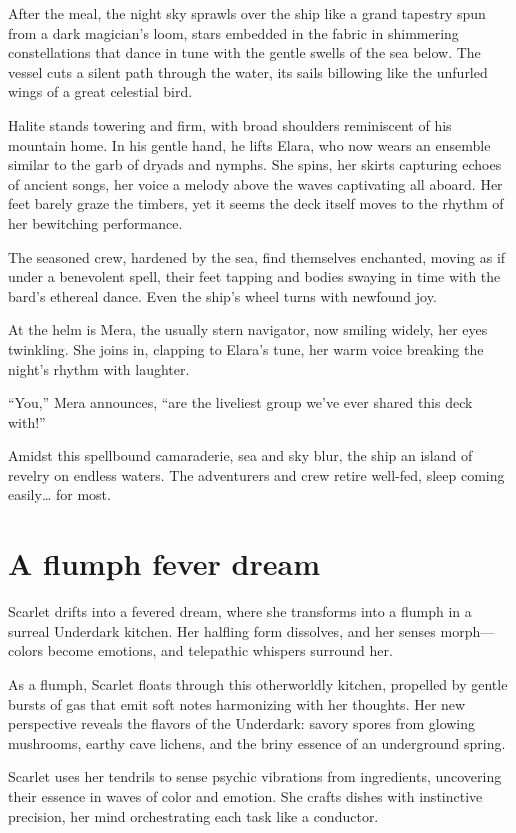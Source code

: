 \documentclass[
  letterpaper,12pt,twoside,twocolumn,openany,
  nodeprecatedcode,bg=full]{dndbook}
\begin{document}
After the meal, the night sky sprawls over the ship like a grand
tapestry spun from a dark magician's loom, stars embedded in the fabric
in shimmering constellations that dance in tune with the gentle swells
of the sea below. The vessel cuts a silent path through the water, its
sails billowing like the unfurled wings of a great celestial bird.

Halite stands towering and firm, with broad shoulders reminiscent of his
mountain home. In his gentle hand, he lifts Elara, who now wears an
ensemble similar to the garb of dryads and nymphs. She spins, her skirts
capturing echoes of ancient songs, her voice a melody above the waves
captivating all aboard. Her feet barely graze the timbers, yet it seems
the deck itself moves to the rhythm of her bewitching performance.

The seasoned crew, hardened by the sea, find themselves enchanted,
moving as if under a benevolent spell, their feet tapping and bodies
swaying in time with the bard's ethereal dance. Even the ship's wheel
turns with newfound joy.

At the helm is Mera, the usually stern navigator, now smiling widely,
her eyes twinkling. She joins in, clapping to Elara's tune, her warm
voice breaking the night's rhythm with laughter.

``You,'' Mera announces, ``are the liveliest group we've ever shared
this deck with!''

Amidst this spellbound camaraderie, sea and sky blur, the ship an island
of revelry on endless waters. The adventurers and crew retire well-fed,
sleep coming easily\ldots{} for most.

\section{A flumph fever dream}\label{a-flumph-fever-dream}

Scarlet drifts into a fevered dream, where she transforms into a flumph
in a surreal Underdark kitchen. Her halfling form dissolves, and her
senses morph--- colors become emotions, and telepathic whispers surround
her.

As a flumph, Scarlet floats through this otherworldly kitchen, propelled
by gentle bursts of gas that emit soft notes harmonizing with her
thoughts. Her new perspective reveals the flavors of the Underdark:
savory spores from glowing mushrooms, earthy cave lichens, and the briny
essence of an underground spring.

Scarlet uses her tendrils to sense psychic vibrations from ingredients,
uncovering their essence in waves of color and emotion. She crafts
dishes with instinctive precision, her mind orchestrating each task like
a conductor.
\end{document}
